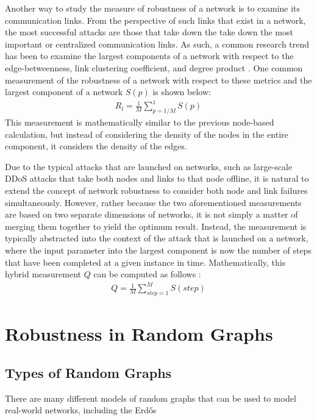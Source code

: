 \documentclass[11pt]{article}
\begin{document}

Another way to study the measure of robustness of a network is to examine its communication links. From the perspective of such links that exist in a network, the most successful attacks are those that take down the take down the most important or centralized communication links. As such, a common research trend has been to examine the largest components of a network with respect to the edge-betweenness, link clustering coefficient, and degree product \cite{NRMalicious}. One common measurement of the robustness of a network with respect to these metrics and the largest component of a network $S(p)$ is shown below:
\begin{eqnarray*}
R_l = \frac{1}{M}\sum_{p = 1/M}^{1}S(p)
\end{eqnarray*}
This measurement is mathematically similar to the previous node-based calculation, but instead of considering the density of the nodes in the entire component, it considers the density of the edges. 

Due to the typical attacks that are launched on networks, such as large-scale DDoS attacks that take both nodes and links to that node offline, it is natural to extend the concept of network robustness to consider both node and link failures simultaneously. However, rather because the two aforementioned measurements are based on two separate dimensions of networks, it is not simply a matter of merging them together to yield the optimum result. Instead, the measurement is typically abstracted into the context of the attack that is launched on a network, where the input parameter into the largest component is now the number of steps that have been completed at a given instance in time. Mathematically, this hybrid measurement $Q$ can be computed as follows \cite{NRMalicious}:
\begin{eqnarray*}
Q = \frac{1}{M}\sum_{step  = 1}^{M}S(step)
\end{eqnarray*}

\section{Robustness in Random Graphs}

\subsection{Types of Random Graphs}
There are many different models of random graphs that can be used to model real-world networks, including the Erd\H{o}s
\end{document}
